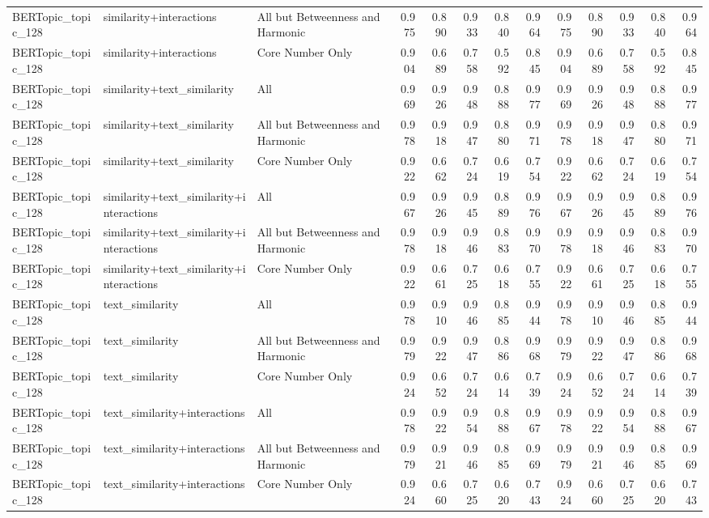 \begin{tabular}{lllrrrrrrrrrr}
BERTopic_topic_128 & similarity+interactions & All but Betweenness and Harmonic & 0.975 & 0.890 & 0.933 & 0.840 & 0.964 & 0.975 & 0.890 & 0.933 & 0.840 & 0.964 \\
BERTopic_topic_128 & similarity+interactions & Core Number Only & 0.904 & 0.689 & 0.758 & 0.592 & 0.845 & 0.904 & 0.689 & 0.758 & 0.592 & 0.845 \\
BERTopic_topic_128 & similarity+text_similarity & All & 0.969 & 0.926 & 0.948 & 0.888 & 0.977 & 0.969 & 0.926 & 0.948 & 0.888 & 0.977 \\
BERTopic_topic_128 & similarity+text_similarity & All but Betweenness and Harmonic & 0.978 & 0.918 & 0.947 & 0.880 & 0.971 & 0.978 & 0.918 & 0.947 & 0.880 & 0.971 \\
BERTopic_topic_128 & similarity+text_similarity & Core Number Only & 0.922 & 0.662 & 0.724 & 0.619 & 0.754 & 0.922 & 0.662 & 0.724 & 0.619 & 0.754 \\
BERTopic_topic_128 & similarity+text_similarity+interactions & All & 0.967 & 0.926 & 0.945 & 0.889 & 0.976 & 0.967 & 0.926 & 0.945 & 0.889 & 0.976 \\
BERTopic_topic_128 & similarity+text_similarity+interactions & All but Betweenness and Harmonic & 0.978 & 0.918 & 0.946 & 0.883 & 0.970 & 0.978 & 0.918 & 0.946 & 0.883 & 0.970 \\
BERTopic_topic_128 & similarity+text_similarity+interactions & Core Number Only & 0.922 & 0.661 & 0.725 & 0.618 & 0.755 & 0.922 & 0.661 & 0.725 & 0.618 & 0.755 \\
BERTopic_topic_128 & text_similarity & All & 0.978 & 0.910 & 0.946 & 0.885 & 0.944 & 0.978 & 0.910 & 0.946 & 0.885 & 0.944 \\
BERTopic_topic_128 & text_similarity & All but Betweenness and Harmonic & 0.979 & 0.922 & 0.947 & 0.886 & 0.968 & 0.979 & 0.922 & 0.947 & 0.886 & 0.968 \\
BERTopic_topic_128 & text_similarity & Core Number Only & 0.924 & 0.652 & 0.724 & 0.614 & 0.739 & 0.924 & 0.652 & 0.724 & 0.614 & 0.739 \\
BERTopic_topic_128 & text_similarity+interactions & All & 0.978 & 0.922 & 0.954 & 0.888 & 0.967 & 0.978 & 0.922 & 0.954 & 0.888 & 0.967 \\
BERTopic_topic_128 & text_similarity+interactions & All but Betweenness and Harmonic & 0.979 & 0.921 & 0.946 & 0.885 & 0.969 & 0.979 & 0.921 & 0.946 & 0.885 & 0.969 \\
BERTopic_topic_128 & text_similarity+interactions & Core Number Only & 0.924 & 0.660 & 0.725 & 0.620 & 0.743 & 0.924 & 0.660 & 0.725 & 0.620 & 0.743 \\

\end{tabular}
